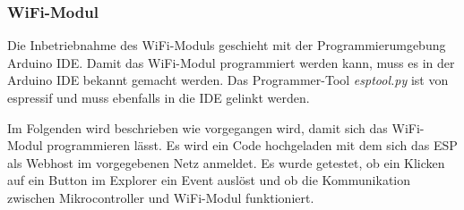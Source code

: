 \subsubsection{WiFi-Modul}
\label{subsubsec:Inbetriebnahme_ESP}

Die Inbetriebnahme des WiFi-Moduls geschieht mit der Programmierumgebung Arduino IDE. Damit das WiFi-Modul programmiert werden kann, muss es in der Arduino IDE bekannt gemacht werden. Das Programmer-Tool \textit{esptool.py} ist von espressif und muss ebenfalls in die IDE gelinkt werden.

Im Folgenden wird beschrieben wie vorgegangen wird, damit sich das WiFi-Modul programmieren lässt. Es wird ein Code hochgeladen mit dem sich das ESP als Webhost im vorgegebenen Netz anmeldet. Es wurde getestet, ob ein Klicken auf ein Button im Explorer ein Event auslöst und ob die Kommunikation zwischen Mikrocontroller und WiFi-Modul funktioniert.

